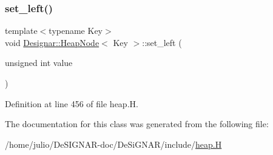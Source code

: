 \subsubsection{\texorpdfstring{set\+\_\+left()}{set\_left()}}
{\footnotesize\ttfamily template$<$typename Key$>$ \\
void \hyperlink{class_designar_1_1_heap_node}{Designar\+::\+Heap\+Node}$<$ Key $>$\+::set\+\_\+left (\begin{DoxyParamCaption}\item[{unsigned int}]{value }\end{DoxyParamCaption})\hspace{0.3cm}{\ttfamily [inline]}}



Definition at line 456 of file heap.\+H.



The documentation for this class was generated from the following file\+:\begin{DoxyCompactItemize}
\item 
/home/julio/\+De\+S\+I\+G\+N\+A\+R-\/doc/\+De\+Si\+G\+N\+A\+R/include/\hyperlink{heap_8_h}{heap.\+H}\end{DoxyCompactItemize}
